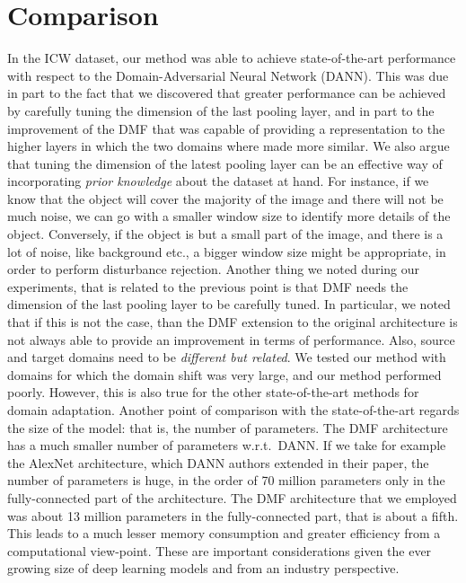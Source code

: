 \documentclass[../main.tex]{subfiles}
\begin{document}
    \chapter{Comparison}\label{chap:comparison}

    In the ICW dataset, our method was able to achieve state-of-the-art performance with respect to the
    Domain-Adversarial Neural Network (DANN). This was due in part to the fact that we discovered that greater
    performance can be achieved by carefully tuning the dimension of the last pooling layer, and in part to
    the improvement of the DMF that was capable of providing a representation to the higher layers in which
    the two domains where made more similar. We also argue that tuning the dimension of the latest pooling layer
    can be an effective way of incorporating \textit{prior knowledge} about the dataset at hand. For instance, if
    we know that the object will cover the majority of the image and there will not be much noise, we can go with a
    smaller window size to identify more details of the object. Conversely, if the object is but a small part of the
    image, and there is a lot of noise, like background etc., a bigger window size might be appropriate, in order to
    perform disturbance rejection.
    \newline
    Another thing we noted during our experiments, that is related to the previous point is that DMF needs the dimension
    of the last pooling layer to be carefully tuned. In particular, we noted that if this is not the case, than the DMF
    extension to the original architecture is not always able to provide an improvement in terms of performance. Also,
    source and target domains need to be \textit{different but related}. We tested our method with domains for which the
    domain shift was very large, and our method performed poorly. However, this is also true for the other state-of-the-art
    methods for domain adaptation.
    \newline
    Another point of comparison with the state-of-the-art regards the size of the model: that is, the number of parameters.
    The DMF architecture has a much smaller number of parameters w.r.t.\ DANN\@.
    If we take for example the AlexNet architecture, which DANN authors extended in their paper, the number of parameters is huge,
    in the order of 70 million parameters only in the fully-connected part of the architecture. The DMF architecture that we employed
    was about 13 million parameters in the fully-connected part, that is about a fifth. This leads to a much lesser memory consumption
    and greater efficiency from a computational view-point. These are important considerations given the ever growing size of deep
    learning models and from an industry perspective.
\end{document}
